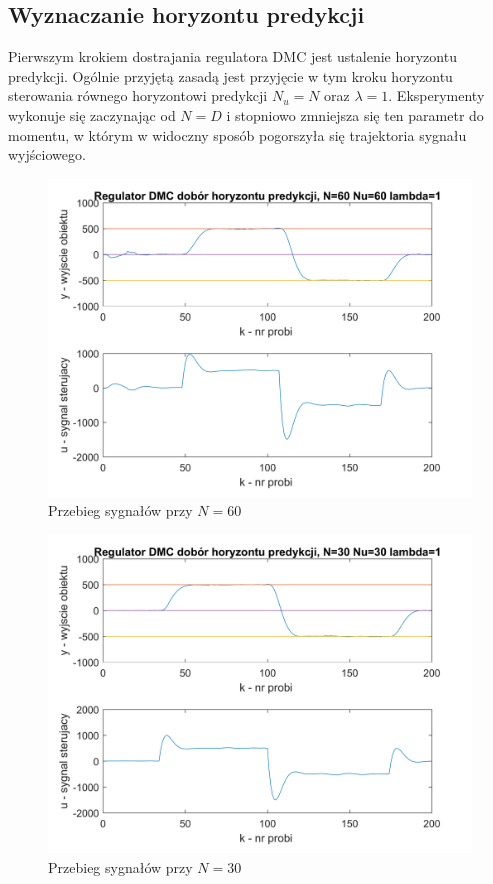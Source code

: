 \documentclass[a4paper, 10pt]{article}
\begin{document}
\subsection{Wyznaczanie horyzontu predykcji}
Pierwszym krokiem dostrajania regulatora DMC jest ustalenie horyzontu predykcji. Ogólnie przyjętą zasadą jest przyjęcie w tym kroku horyzontu sterowania równego horyzontowi predykcji $N_{u}=N$ oraz $\lambda=1$. Eksperymenty wykonuje się zaczynając od $N=D$ i stopniowo zmniejsza się ten parametr do momentu, w którym w widoczny sposób pogorszyła się trajektoria sygnału wyjściowego. 
\begin{figure}[H]
	\centering
	\includegraphics[width=0.9\linewidth]{DMC60601}
	\caption{Przebieg sygnałów przy $N=60$}
	\label{fig:DMC60601}
\end{figure}
\begin{figure}[H]
	\centering
	\includegraphics[width=0.9\linewidth]{DMC30301}
	\caption{Przebieg sygnałów przy $N=30$}
	\label{fig:DMC30301}
\end{figure}
\end{document}
